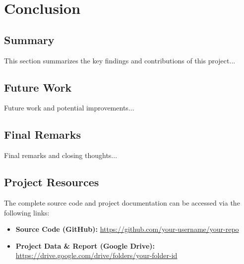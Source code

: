 \chapter*{Conclusion}

\section*{Summary}

This section summarizes the key findings and contributions of this project...

\section*{Future Work}

Future work and potential improvements...

\section*{Final Remarks}

Final remarks and closing thoughts...

\section*{Project Resources}

The complete source code and project documentation can be accessed via the following links:

\begin{itemize}
    \item \textbf{Source Code (GitHub):} \url{https://github.com/your-username/your-repo}
    \item \textbf{Project Data & Report (Google Drive):} \url{https://drive.google.com/drive/folders/your-folder-id}
\end{itemize}

